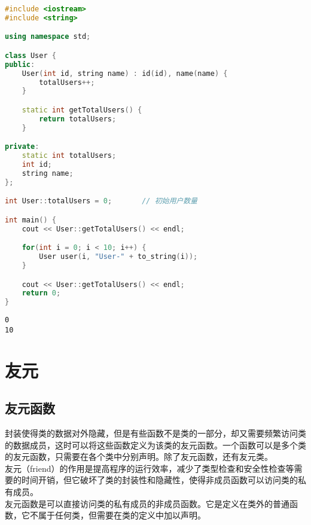 \begin{lstlisting}[language=C++]
#include <iostream>
#include <string>

using namespace std;

class User {
public:
    User(int id, string name) : id(id), name(name) {
        totalUsers++;
    }

    static int getTotalUsers() {
        return totalUsers;
    }

private:
    static int totalUsers;
    int id;
    string name;
};

int User::totalUsers = 0;       // 初始用户数量

int main() {
    cout << User::getTotalUsers() << endl;

    for(int i = 0; i < 10; i++) {
        User user(i, "User-" + to_string(i));
    }

    cout << User::getTotalUsers() << endl;
    return 0;
}
\end{lstlisting}

\begin{tcolorbox}
	\begin{verbatim}
0
10
	\end{verbatim}
\end{tcolorbox}

\newpage

\section{友元}

\subsection{友元函数}

封装使得类的数据对外隐藏，但是有些函数不是类的一部分，却又需要频繁访问类的数据成员，这时可以将这些函数定义为该类的友元函数。一个函数可以是多个类的友元函数，只需要在各个类中分别声明。除了友元函数，还有友元类。\\

友元（friend）的作用是提高程序的运行效率，减少了类型检查和安全性检查等需要的时间开销，但它破坏了类的封装性和隐藏性，使得非成员函数可以访问类的私有成员。\\

友元函数是可以直接访问类的私有成员的非成员函数。它是定义在类外的普通函数，它不属于任何类，但需要在类的定义中加以声明。

\vspace{-0.5cm}

